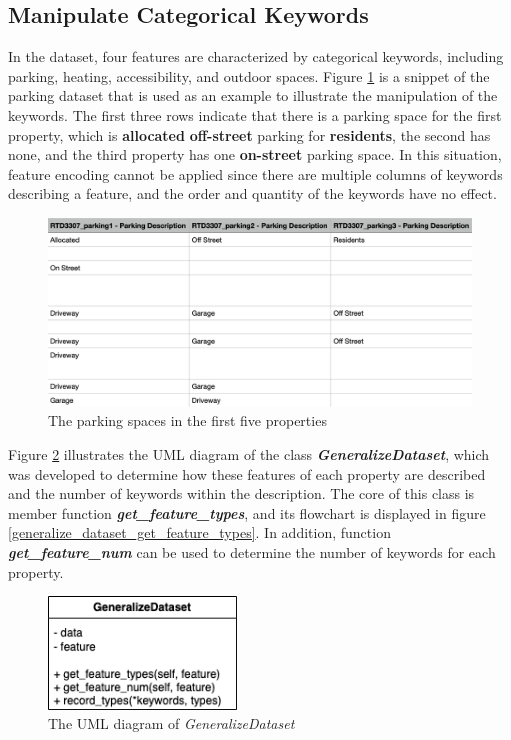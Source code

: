 \documentclass[12pt,twoside]{report}
\begin{document}
\subsection{Manipulate Categorical Keywords}
In the dataset, four features are characterized by categorical keywords, including parking, heating, accessibility, and outdoor spaces. Figure \ref{parking_dataset} is a snippet of the parking dataset that is used as an example to illustrate the manipulation of the keywords. The first three rows indicate that there is a parking space for the first property, which is \textbf{allocated} \textbf{off-street} parking for \textbf{residents}, the second has none, and the third property has one \textbf{on-street} parking space. In this situation, feature encoding cannot be applied since there are multiple columns of keywords describing a feature, and the order and quantity of the keywords have no effect.

\begin{figure}[h]
	\centering
	\includegraphics[width=12cm]{parking_dataset}
	\caption{The parking spaces in the first five properties}
	\label{parking_dataset}
\end{figure}

Figure \ref{uml_generalize_dataset} illustrates the UML diagram of the class \textit{\textbf{GeneralizeDataset}}, which was developed to determine how these features of each property are described and the number of keywords within the description. The core of this class is member function \textit{\textbf{get\_feature\_types}}, and its flowchart is displayed in figure \ref{generalize_dataset_get_feature_types}. In addition, function \textbf{\textit{get\_feature\_num}} can be used to determine the number of keywords for each property. 
\begin{figure}[h]
	\centering
	\includegraphics[width=5cm]{uml_generalize_dataset}
	\caption{The UML diagram of \textit{GeneralizeDataset}}
	\label{uml_generalize_dataset}
\end{figure}
\end{document}
